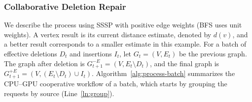 
\subsubsection{Collaborative Deletion Repair}
\label{sec:deletion-repair}
We describe the process using SSSP with positive edge weights (BFS uses unit weights). A vertex result is its current distance estimate, denoted by $d(v)$, and a better result corresponds to a smaller estimate in this example. For a batch of effective deletions $D_t$ and insertions $I_t$, let $G_t=(V,E_t)$ be the previous graph. The graph after deletion is $G_{t+1}^{-E}=(V,E_t\setminus D_t)$, and the final graph is $G_{t+1}^{+E}=(V,(E_t\setminus D_t)\cup I_t)$. Algorithm~\ref{alg:process-batch} summarizes the CPU--GPU cooperative workflow of a batch, which starts by grouping the requests by source (Line~\ref{ln:group}).

